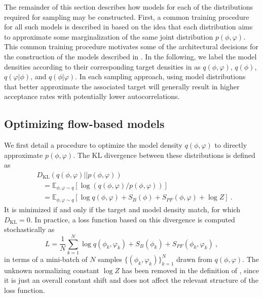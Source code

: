 \documentclass[aps,prd,twocolumn,nofootinbib,superscriptaddress,preprintnumbers]{revtex4-1}
\newcommand{\KL}{\mathrm{KL}}
\begin{document}
The remainder of this section describes how models for each of the distributions required for sampling may be constructed. First, a common training procedure for all such models is described in  based on the idea that each distribution aims to approximate some marginalization of the same joint distribution $p(\phi,\varphi)$. This common training procedure motivates some of the architectural decisions for the construction of the models described in . In the following, we label the model densities according to their corresponding target densities in  as $q(\phi,\varphi)$, $q(\phi)$, $q(\varphi|\phi)$, and $q(\phi|\varphi)$. In each sampling approach, using model distributions that better approximate the associated target will generally result in higher acceptance rates with potentially lower autocorrelations. 


\subsection{Optimizing flow-based models}
\label{sec:flow-optim}

We first detail a procedure to optimize the model density $q(\phi, \varphi)$ to directly approximate $p(\phi, \varphi)$. The KL divergence between these distributions is defined as
%
\begin{equation}\label{eq:kl_joint}
\begin{aligned}
    &D_{\KL}(q(\phi, \varphi) || p(\phi, \varphi)) \\
    &\hspace{10pt} = \mathbb{E}_{\phi, \varphi \sim q}\left[\log(q(\phi, \varphi) / p(\phi, \varphi))\right] \\
    &\hspace{10pt} = \mathbb{E}_{\phi, \varphi \sim q}\left[ \log q(\phi,\varphi) + S_B(\phi) + S_{PF}(\phi,\varphi) + \log{Z} \right]\ .
\end{aligned}
\end{equation}
%
It is minimized if and only if the target and model density match, for which ${D_{\KL} = 0}$. In practice, a loss function based on this divergence is computed stochastically as
%
\begin{equation}\label{eq:kl_joint_estimate}
    L = \frac{1}{N}\sum_{k=1}^N\log q(\phi_k, \varphi_k) + S_B(\phi_k) + S_{PF}(\phi_k, \varphi_k)\ ,
\end{equation}
%
in terms of a mini-batch of $N$ samples $\{(\phi_k, \varphi_k)\}_{k=1}^{N}$ drawn from $q(\phi,\varphi)$. The unknown normalizing constant $\log Z$ has been removed in the definition of , since it is just an overall constant shift and does not affect the relevant structure of the loss function.
\end{document}
